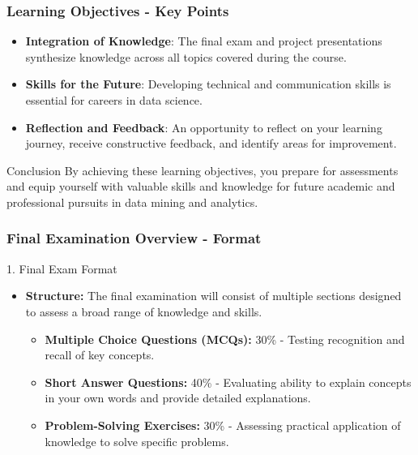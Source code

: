\documentclass[aspectratio=169]{beamer}
\begin{document}
\begin{frame}[fragile]
    \frametitle{Learning Objectives - Key Points}
    \begin{itemize}
        \item \textbf{Integration of Knowledge}: 
        The final exam and project presentations synthesize knowledge across all topics covered during the course.
        \item \textbf{Skills for the Future}: 
        Developing technical and communication skills is essential for careers in data science.
        \item \textbf{Reflection and Feedback}: 
        An opportunity to reflect on your learning journey, receive constructive feedback, and identify areas for improvement.
    \end{itemize}
    
    \begin{block}{Conclusion}
        By achieving these learning objectives, you prepare for assessments and equip yourself with valuable skills and knowledge for future academic and professional pursuits in data mining and analytics.
    \end{block}
\end{frame}

\begin{frame}[fragile]
    \frametitle{Final Examination Overview - Format}
    \begin{block}{1. Final Exam Format}
        \begin{itemize}
            \item \textbf{Structure:} The final examination will consist of multiple sections designed to assess a broad range of knowledge and skills.
            \begin{itemize}
                \item \textbf{Multiple Choice Questions (MCQs):} 30\% - Testing recognition and recall of key concepts.
                \item \textbf{Short Answer Questions:} 40\% - Evaluating ability to explain concepts in your own words and provide detailed explanations.
                \item \textbf{Problem-Solving Exercises:} 30\% - Assessing practical application of knowledge to solve specific problems.
            \end{itemize}
        \end{itemize}
    \end{block}
\end{frame}
\end{document}
